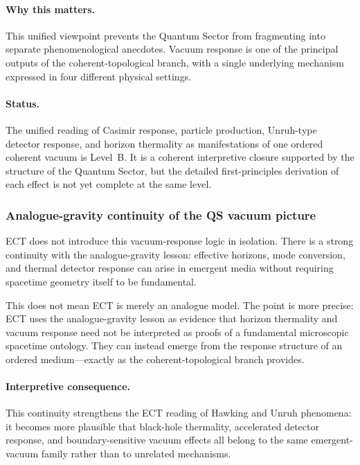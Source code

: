 \paragraph{Why this matters.}
This unified viewpoint prevents the Quantum Sector from fragmenting
into separate phenomenological anecdotes.
Vacuum response is one of the principal outputs of the
coherent-topological branch, with a single underlying mechanism
expressed in four different physical settings.

\paragraph{Status.}
The unified reading of Casimir response, particle production,
Unruh-type detector response, and horizon thermality as manifestations
of one ordered coherent vacuum is Level~B.
It is a coherent interpretive closure supported by the structure of
the Quantum Sector, but the detailed first-principles derivation of
each effect is not yet complete at the same level.

\subsubsection*{Analogue-gravity continuity of the QS vacuum picture}

ECT does not introduce this vacuum-response logic in isolation.
There is a strong continuity with the analogue-gravity lesson:
effective horizons, mode conversion, and thermal detector response
can arise in emergent media without requiring spacetime geometry
itself to be fundamental.

This does not mean ECT is merely an analogue model.
The point is more precise: ECT uses the analogue-gravity lesson as
evidence that horizon thermality and vacuum response need not be
interpreted as proofs of a fundamental microscopic spacetime
ontology.
They can instead emerge from the response structure of an ordered
medium---exactly as the coherent-topological branch provides.

\paragraph{Interpretive consequence.}
This continuity strengthens the ECT reading of Hawking and Unruh
phenomena: it becomes more plausible that black-hole thermality,
accelerated detector response, and boundary-sensitive vacuum effects
all belong to the same emergent-vacuum family rather than to
unrelated mechanisms.

